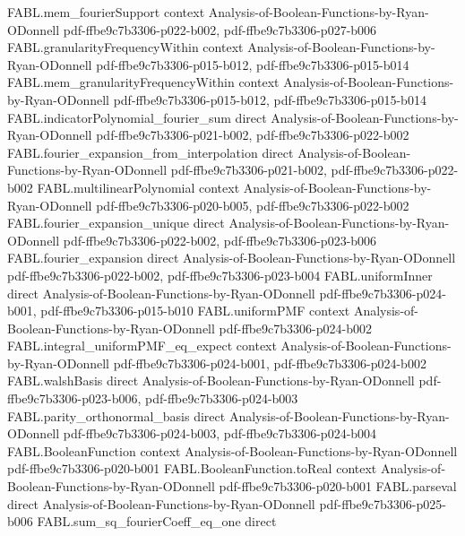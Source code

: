 \begin{theorem}
\proofstep
  {FABL.mem_fourierSupport}
  {context}
  {Analysis-of-Boolean-Functions-by-Ryan-ODonnell}
  {pdf-ffbe9c7b3306-p022-b002,
    pdf-ffbe9c7b3306-p027-b006}
\proofstep
  {FABL.granularityFrequencyWithin}
  {context}
  {Analysis-of-Boolean-Functions-by-Ryan-ODonnell}
  {pdf-ffbe9c7b3306-p015-b012,
    pdf-ffbe9c7b3306-p015-b014}
\proofstep
  {FABL.mem_granularityFrequencyWithin}
  {context}
  {Analysis-of-Boolean-Functions-by-Ryan-ODonnell}
  {pdf-ffbe9c7b3306-p015-b012,
    pdf-ffbe9c7b3306-p015-b014}
\proofstep
  {FABL.indicatorPolynomial_fourier_sum}
  {direct}
  {Analysis-of-Boolean-Functions-by-Ryan-ODonnell}
  {pdf-ffbe9c7b3306-p021-b002,
    pdf-ffbe9c7b3306-p022-b002}
\proofstep
  {FABL.fourier_expansion_from_interpolation}
  {direct}
  {Analysis-of-Boolean-Functions-by-Ryan-ODonnell}
  {pdf-ffbe9c7b3306-p021-b002,
    pdf-ffbe9c7b3306-p022-b002}
\proofstep
  {FABL.multilinearPolynomial}
  {context}
  {Analysis-of-Boolean-Functions-by-Ryan-ODonnell}
  {pdf-ffbe9c7b3306-p020-b005,
    pdf-ffbe9c7b3306-p022-b002}
\proofstep
  {FABL.fourier_expansion_unique}
  {direct}
  {Analysis-of-Boolean-Functions-by-Ryan-ODonnell}
  {pdf-ffbe9c7b3306-p022-b002,
    pdf-ffbe9c7b3306-p023-b006}
\proofstep
  {FABL.fourier_expansion}
  {direct}
  {Analysis-of-Boolean-Functions-by-Ryan-ODonnell}
  {pdf-ffbe9c7b3306-p022-b002,
    pdf-ffbe9c7b3306-p023-b004}
\proofstep
  {FABL.uniformInner}
  {direct}
  {Analysis-of-Boolean-Functions-by-Ryan-ODonnell}
  {pdf-ffbe9c7b3306-p024-b001,
    pdf-ffbe9c7b3306-p015-b010}
\proofstep
  {FABL.uniformPMF}
  {context}
  {Analysis-of-Boolean-Functions-by-Ryan-ODonnell}
  {pdf-ffbe9c7b3306-p024-b002}
\proofstep
  {FABL.integral_uniformPMF_eq_expect}
  {context}
  {Analysis-of-Boolean-Functions-by-Ryan-ODonnell}
  {pdf-ffbe9c7b3306-p024-b001,
    pdf-ffbe9c7b3306-p024-b002}
\proofstep
  {FABL.walshBasis}
  {direct}
  {Analysis-of-Boolean-Functions-by-Ryan-ODonnell}
  {pdf-ffbe9c7b3306-p023-b006,
    pdf-ffbe9c7b3306-p024-b003}
\proofstep
  {FABL.parity_orthonormal_basis}
  {direct}
  {Analysis-of-Boolean-Functions-by-Ryan-ODonnell}
  {pdf-ffbe9c7b3306-p024-b003,
    pdf-ffbe9c7b3306-p024-b004}
\proofstep
  {FABL.BooleanFunction}
  {context}
  {Analysis-of-Boolean-Functions-by-Ryan-ODonnell}
  {pdf-ffbe9c7b3306-p020-b001}
\proofstep
  {FABL.BooleanFunction.toReal}
  {context}
  {Analysis-of-Boolean-Functions-by-Ryan-ODonnell}
  {pdf-ffbe9c7b3306-p020-b001}
\proofstep
  {FABL.parseval}
  {direct}
  {Analysis-of-Boolean-Functions-by-Ryan-ODonnell}
  {pdf-ffbe9c7b3306-p025-b006}
\proofstep
  {FABL.sum_sq_fourierCoeff_eq_one}
  {direct}

\end{theorem}
